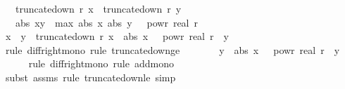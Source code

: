 \begin{isabellebody}
\ \ \ {\isachardoublequoteopen}truncate{\isacharunderscore}{\kern0pt}down\ r\ x\ {\isacharequal}{\kern0pt}\ truncate{\isacharunderscore}{\kern0pt}down\ r\ y{\isachardoublequoteclose}\isanewline
\ \ \ {\isachardoublequoteopen}abs\ {\isacharparenleft}{\kern0pt}x{\isacharminus}{\kern0pt}y{\isacharparenright}{\kern0pt}\ {\isasymle}\ max\ {\isacharparenleft}{\kern0pt}abs\ x{\isacharparenright}{\kern0pt}\ {\isacharparenleft}{\kern0pt}abs\ y{\isacharparenright}{\kern0pt}\ {\isacharasterisk}{\kern0pt}\ {}\ powr\ {\isacharparenleft}{\kern0pt}{\isacharminus}{\kern0pt}real\ r{\isacharparenright}{\kern0pt}{\isachardoublequoteclose}\isanewline
%
\isadelimproof
%
\endisadelimproof
%
\isatagproof
{}\isamarkupfalse%
\ {\isacharminus}{\kern0pt}\ \isanewline
\ \ \isamarkupfalse%
\ {\isachardoublequoteopen}x\ {\isacharminus}{\kern0pt}\ y\ {\isasymle}\ truncate{\isacharunderscore}{\kern0pt}down\ r\ x\ {\isacharplus}{\kern0pt}\ abs\ x\ {\isacharasterisk}{\kern0pt}\ {}\ powr\ {\isacharparenleft}{\kern0pt}{\isacharminus}{\kern0pt}real\ r{\isacharparenright}{\kern0pt}\ {\isacharminus}{\kern0pt}\ y{\isachardoublequoteclose}\isanewline
\ \ \ \ \isamarkupfalse%
\ {\isacharparenleft}{\kern0pt}rule\ diff{\isacharunderscore}{\kern0pt}right{\isacharunderscore}{\kern0pt}mono{\isacharcomma}{\kern0pt}\ rule\ truncate{\isacharunderscore}{\kern0pt}down{\isacharunderscore}{\kern0pt}ge{\isacharparenright}{\kern0pt}\isanewline
\ \ \isamarkupfalse%
\ \isamarkupfalse%
\ {\isachardoublequoteopen}{\isachardot}{\kern0pt}{\isachardot}{\kern0pt}{\isachardot}{\kern0pt}\ {\isasymle}\ y\ {\isacharplus}{\kern0pt}\ abs\ x\ {\isacharasterisk}{\kern0pt}\ {}\ powr\ {\isacharparenleft}{\kern0pt}{\isacharminus}{\kern0pt}real\ r{\isacharparenright}{\kern0pt}\ {\isacharminus}{\kern0pt}\ y{\isachardoublequoteclose}\isanewline
\ \ \ \ \isamarkupfalse%
\ {\isacharparenleft}{\kern0pt}rule\ diff{\isacharunderscore}{\kern0pt}right{\isacharunderscore}{\kern0pt}mono{\isacharcomma}{\kern0pt}\ rule\ add{\isacharunderscore}{\kern0pt}mono{\isacharparenright}{\kern0pt}\isanewline
\ \ \ \ \ \isamarkupfalse%
\ {\isacharparenleft}{\kern0pt}subst\ assms{\isacharparenleft}{\kern0pt}{}{\isacharparenright}{\kern0pt}{\isacharcomma}{\kern0pt}\ rule\ truncate{\isacharunderscore}{\kern0pt}down{\isacharunderscore}{\kern0pt}le{\isacharcomma}{\kern0pt}\ simp{\isacharparenright}{\kern0pt}\isanewline
\ \ \ \ \isamarkupfalse%

\end{isabellebody}
